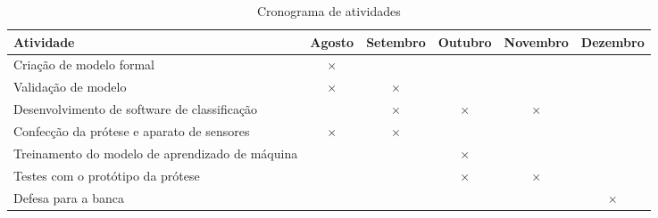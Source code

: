 \begin{table}[htbp]
  \centering
  \caption{Cronograma de atividades}
  \label{tab:cronograma}
  \begin{tabularx}{\textwidth}{|X|c|c|c|c|c|}
    \hline
    \textbf{Atividade} & \textbf{Agosto} & \textbf{Setembro} & \textbf{Outubro} & \textbf{Novembro} & \textbf{Dezembro} \\
    \hline
    Criação de modelo formal & \(\times\) & & & & \\
    \hline
    Validação de modelo & \(\times\) & \(\times\)  &  & & \\
    \hline
    Desenvolvimento de software de classificação & & \(\times\) & \(\times\) & \(\times\) & \\
    \hline
    Confecção da prótese e aparato de sensores & \(\times\) & \(\times\) & & &  \\
    \hline
    Treinamento do modelo de aprendizado de máquina & & & \(\times\) & &  \\
    \hline
    Testes com o protótipo da prótese & & & \(\times\) & \(\times\) &  \\
    \hline
    Defesa para a banca & & & & & \(\times\)  \\
    \hline
  \end{tabularx}
\end{table}